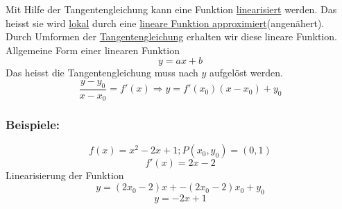 \documentclass[11pt]{amsart}
\theoremstyle{remark}
\begin{document}
 Mit Hilfe der Tangentengleichung kann eine Funktion \underline{linearisiert} werden. Das heisst sie wird \underline{lokal} durch eine \underline{lineare Funktion approximiert}(angen\"ahert).\\
 Durch Umformen der \underline{Tangentengleichung} erhalten wir diese lineare Funktion.\\
 Allgemeine Form einer linearen Funktion
 \begin{equation*}
 y=ax+b
 \end{equation*}
 Das heisst die Tangentengleichung muss nach $y$ aufgel\"ost werden.
 \begin{equation*}
 \frac {y-y_0}{x-x_0}=f'(x) \Rightarrow y=f'(x_0)(x-x_0)+y_0
 \end{equation*}
\begin{figure}[h]
  \centering
  

  \end{figure}
 \subsubsection*{Beispiele:}
 \begin{equation}
 f(x)=x^2-2x+1; P(x_0,y_0)=(0,1)
 \end{equation}
 \begin{equation*}
 f'(x)=2x-2
 \end{equation*}
 Linearisierung der Funktion
 \begin{equation}
 y=(2x_0-2)x+-(2x_0-2)x_0+y_0
 \end{equation}
 \begin{equation*}
 y=-2x+1
 \end{equation*}
 
\end{document}
